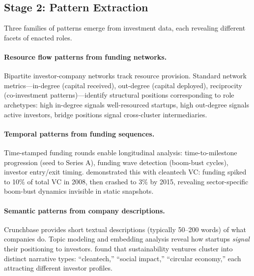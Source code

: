 \documentclass[../main.tex]{subfiles}
\begin{document}
\subsection{Stage 2: Pattern Extraction}

Three families of patterns emerge from investment data, each revealing
different facets of enacted roles.

\paragraph{Resource flow patterns from funding networks.}
Bipartite investor-company networks track resource provision.
Standard network metrics---in-degree (capital received),
out-degree (capital deployed), reciprocity (co-investment patterns)---identify
structural positions corresponding to role archetypes:
high in-degree signals well-resourced startups,
high out-degree signals active investors,
bridge positions signal cross-cluster intermediaries.

\paragraph{Temporal patterns from funding sequences.}
Time-stamped funding rounds enable longitudinal analysis:
time-to-milestone progression (seed to Series A),
funding wave detection (boom-bust cycles),
investor entry/exit timing.
\textcite{vandenheuvel2022cleantech} demonstrated this with cleantech VC:
funding spiked to 10\% of total VC in 2008, then crashed to 3\% by 2015,
revealing sector-specific boom-bust dynamics invisible in static snapshots.

\paragraph{Semantic patterns from company descriptions.}
Crunchbase provides short textual descriptions (typically 50--200 words)
of what companies do.
Topic modeling and embedding analysis reveal how startups \emph{signal}
their positioning to investors.
\textcite{yang2024sustainability} found that sustainability ventures cluster
into distinct narrative types: ``cleantech,'' ``social impact,''
``circular economy,'' each attracting different investor profiles.
\end{document}
